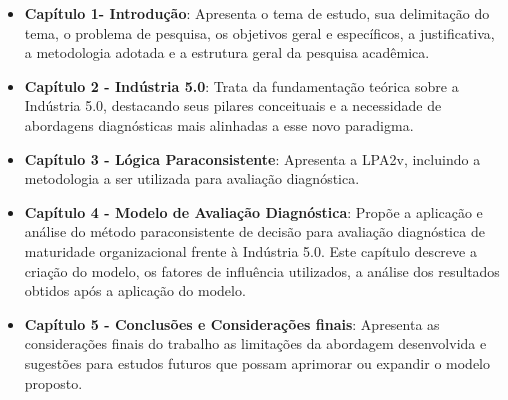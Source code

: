 \begin{itemize}
    \item \textbf{Capítulo 1- Introdução}: Apresenta o tema de estudo, sua delimitação do tema, o problema de pesquisa, os objetivos geral e específicos, a justificativa, a metodologia adotada e a estrutura geral da pesquisa acadêmica.
    
    \item \textbf{Capítulo 2 - Indústria 5.0}: Trata da fundamentação teórica sobre a Indústria 5.0, destacando seus pilares conceituais e a necessidade de abordagens diagnósticas mais alinhadas a esse novo paradigma.
    
    \item \textbf{Capítulo 3 - Lógica Paraconsistente}: Apresenta a \gls{LPA2v}, incluindo a metodologia a ser utilizada para avaliação diagnóstica.
    
    \item \textbf{Capítulo 4 - Modelo de Avaliação Diagnóstica}: Propõe a aplicação e análise do método paraconsistente de decisão para avaliação diagnóstica de maturidade organizacional frente à Indústria 5.0.
    Este capítulo descreve a criação do modelo, os fatores de influência utilizados, a análise dos resultados obtidos após a aplicação do modelo.
    
    \item \textbf{Capítulo 5 - Conclusões e Considerações finais}: Apresenta as considerações finais do trabalho as limitações da abordagem desenvolvida e sugestões para estudos futuros que possam aprimorar ou expandir o modelo proposto.
\end{itemize}

